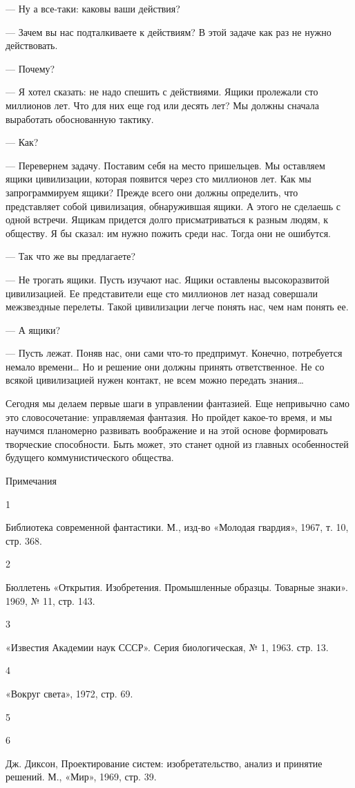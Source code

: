 — Ну а все-таки: каковы ваши действия?

— Зачем вы нас подталкиваете к действиям?  В этой задаче как раз не  нужно
действовать.

— Почему?

— Я  хотел сказать:  не надо  спешить с  действиями. Ящики  пролежали  сто
миллионов лет.  Что для  них еще  год или  десять лет?  Мы должны  сначала
выработать обоснованную тактику.

— Как?

— Перевернем задачу. Поставим себя на место пришельцев. Мы оставляем ящики
цивилизации,  которая   появится  через   сто   миллионов  лет.   Как   мы
запрограммируем  ящики?   Прежде   всего  они   должны   определить,   что
представляет собой цивилизация, обнаружившая ящики. А этого не сделаешь  с
одной встречи. Ящикам  придется долго  присматриваться к  разным людям,  к
обществу. Я бы сказал: им нужно пожить среди нас. Тогда они не ошибутся.

— Так что же вы предлагаете?

— Не  трогать ящики.  Пусть изучают  нас. Ящики  оставлены  высокоразвитой
цивилизацией. Ее  представители  еще  сто миллионов  лет  назад  совершали
межзвездные перелеты. Такой цивилизации легче  понять нас, чем нам  понять
ее.

— А ящики?

— Пусть лежат. Поняв нас, они сами что-то предпримут. Конечно, потребуется
немало времени…  Но и  решение  они должны  принять ответственное.  Не  со
всякой цивилизацией нужен контакт, не всем можно передать знания…

Сегодня мы делаем первые шаги  в управлении фантазией. Еще непривычно само
это словосочетание: управляемая фантазия. Но  пройдет какое-то время, и мы
научимся  планомерно развивать  воображение и  на этой  основе формировать
творческие  способности.   Быть  может,   это  станет  одной   из  главных
особенностей будущего коммунистического общества.

Примечания

1

Библиотека современной фантастики. М., изд-во «Молодая гвардия», 1967,  т.
10, стр. 368.

2

Бюллетень «Открытия. Изобретения.  Промышленные образцы. Товарные  знаки».
1969, № 11, стр. 143.

3

«Известия Академии наук СССР». Серия биологическая, № 1, 1963. стр. 13.

4

«Вокруг света», 1972, стр. 69.

5



6

Дж.  Диксон, Проектирование  систем: изобретательство,  анализ и  принятие
решений. М., «Мир», 1969, стр. 39.

